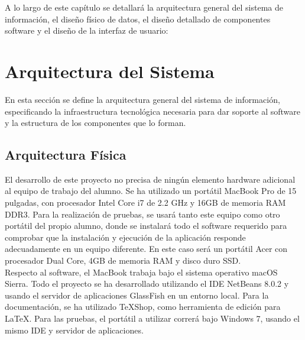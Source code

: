 

A lo largo de este capítulo se detallará la arquitectura general del sistema de información, el diseño fí­sico de datos, el diseño detallado de componentes software y el diseño de la interfaz de usuario:

\section{Arquitectura del Sistema}

En esta sección se define la arquitectura general del sistema de información, especificando la infraestructura tecnológica necesaria para dar soporte al software y la estructura de los componentes que lo forman.


\subsection{Arquitectura Fí­sica} \label{sec:arquitectura-fisica}

El desarrollo de este proyecto no precisa de ningún elemento hardware adicional al equipo de trabajo del alumno. Se ha utilizado un portátil MacBook Pro de 15 pulgadas, con procesador Intel Core i7 de 2.2 GHz y 16GB de memoria RAM DDR3. Para la realización de pruebas, se usará tanto este equipo como otro portátil del propio alumno, donde se instalará todo el software requerido para comprobar que la instalación y ejecución de la aplicación responde adecuadamente en un equipo diferente. En este caso será un portátil Acer con procesador Dual Core, 4GB de memoria RAM y disco duro SSD. \\

Respecto al software, el MacBook trabaja bajo el sistema operativo macOS Sierra. Todo el proyecto se ha desarrollado utilizando el IDE NetBeans 8.0.2 y usando el servidor de aplicaciones GlassFish en un entorno local. Para la documentación, se ha utilizado TeXShop, como herramienta de edición para \LaTeX. Para las pruebas, el portátil a utilizar correrá bajo Windows 7, usando el mismo IDE y servidor de aplicaciones. \\


